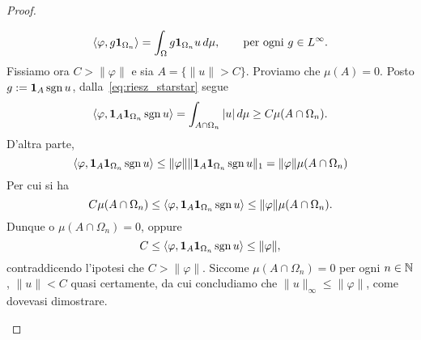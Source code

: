 \begin{proof}
\begin{enumerate}
		\begin{equation}
		\label{eq:riesz_starstar}
			\langle \varphi, g {\boldsymbol{1}}_{\Omega_n} \rangle = \int_\Omega g {\boldsymbol{1}}_{\Omega_n} u\,d\mu, \qquad \text{per ogni $g \in L^\infty$}.
		\end{equation}
		Fissiamo ora $C > \|\varphi\|$ e sia $A = \{\|u\| > C\}$. Proviamo che $\mu(A) = 0$. Posto $g := {\boldsymbol{1}}_A \operatorname{sgn} u$, dalla~\eqref{eq:riesz_starstar} segue
		\begin{equation*}
			\langle \varphi, {\boldsymbol{1}}_A {\boldsymbol{1}}_{\Omega_n} \operatorname{sgn} u \rangle = \int_{A \cap \Omega_n} |u|\,d\mu \geq C \mu(A \cap \Omega_n).
		\end{equation*}
		D'altra parte,
		\begin{equation*}
			\langle \varphi, {\boldsymbol{1}}_A {\boldsymbol{1}}_{\Omega_n} \operatorname{sgn} u \rangle \leq \|\varphi\| \|{\boldsymbol{1}}_A {\boldsymbol{1}}_{\Omega_n} \operatorname{sgn} u\|_1 = \|\varphi\| \mu(A \cap \Omega_n)
		\end{equation*}
		Per cui si ha
		\begin{equation*}
			C \mu(A \cap \Omega_n) \leq \langle \varphi, {\boldsymbol{1}}_A {\boldsymbol{1}}_{\Omega_n} \operatorname{sgn} u \rangle \leq \|\varphi\| \mu(A \cap \Omega_n).
		\end{equation*}
		Dunque o $\mu(A \cap \Omega_n) = 0$, oppure
		\begin{equation*}
			C \leq \langle \varphi, {\boldsymbol{1}}_A {\boldsymbol{1}}_{\Omega_n} \operatorname{sgn} u \rangle \leq \|\varphi\|,
		\end{equation*}
		contraddicendo l'ipotesi che $C > \|\varphi\|$. Siccome $\mu(A \cap \Omega_n) = 0$ per ogni $n \in \mathbb{N}$, $\|u\| < C$ quasi certamente, da cui concludiamo che $\|u\|_\infty \leq \|\varphi\|$, come dovevasi dimostrare.


\end{enumerate}
\end{proof}
